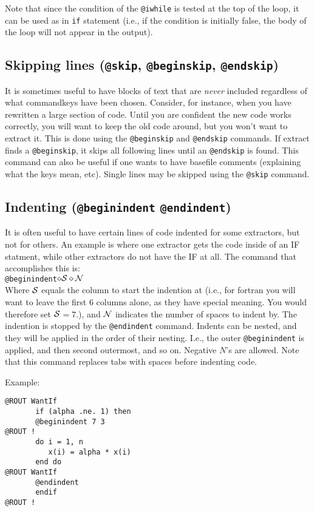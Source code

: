 Note that since the condition of the {\tt @iwhile} is tested at the top of
the loop, it can be used as in {\tt if} statement (i.e., if the condition
is initially false, the body of the loop will not appear in the output).

\subsection{Skipping lines ({\tt @skip}, {\tt @beginskip}, {\tt @endskip})}
It is sometimes useful to have blocks of text that are {\em never} included
regardless of what commandkeys have been chosen.  Consider, for instance,
when you have rewritten a large section of code.  Until you are confident
the new code works correctly, you will want to keep the old code around,
but you won't want to extract it.  This is done using the 
{\tt @beginskip} and {\tt @endskip} commands.  
If extract finds a {\tt @beginskip},
it skips all following lines until an {\tt @endskip} is found.  This command
can also be useful if one wants to have basefile comments (explaining
what the keys mean, etc).
Single lines may be skipped using the {\tt @skip} command.

\subsection{Indenting ({\tt @beginindent} {\tt @endindent})}
\label{sec-indent}
It is often useful to have certain lines of code indented for some
extractors, but not for others.  An example is where one extractor
gets the code inside of an IF statment, while other extractors do
not have the IF at all.  The command that accomplishes this is:\\
{\tt @beginindent$\diamond\cal S\diamond N$}\\
Where $\cal S$ equals the column to start the indention at (i.e., for
fortran you will want to leave the first 6 columns alone, as they have
special meaning.  You would therefore set $\cal S$$= 7$.), and
$\cal N$ indicates the number of spaces to indent by.  The indention
is stopped by the {\tt @endindent} command.  Indents can be nested, and they
will be applied in the order of their nesting.  I.e., the outer 
{\tt @beginindent} is applied, and then second outermost, and so on.
Negative {\tt $N$}'s are allowed.
Note that this command replaces tabs with spaces before indenting code.

\noindent
Example:
\begin{verbatim}
@ROUT WantIf
       if (alpha .ne. 1) then
       @beginindent 7 3
@ROUT !
       do i = 1, n
          x(i) = alpha * x(i)
       end do
@ROUT WantIf
       @endindent
       endif
@ROUT !
\end{verbatim}

